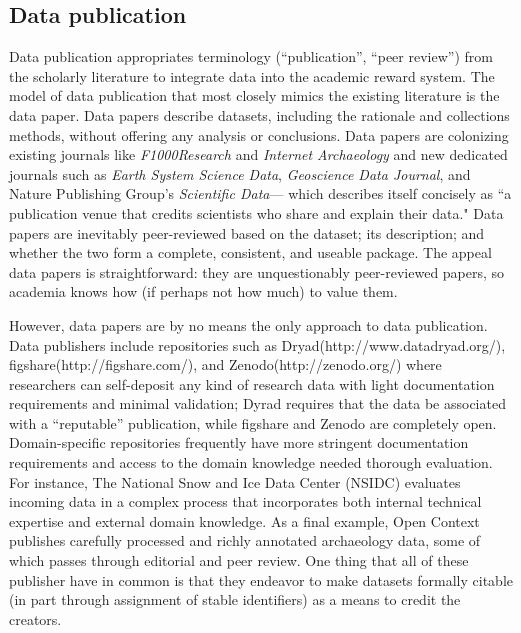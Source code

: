 \documentclass[10pt]{article}
\begin{document}
\subsection*{Data publication}
 
Data publication appropriates terminology (``publication'', ``peer review'') from the scholarly literature to integrate data into the academic reward system\cite{costello_motivating_2009, lawrence_data_2011, atici_other_2012}.
The model of data publication that most closely mimics the existing literature is the data paper.
Data papers describe datasets, including the rationale and collections methods, without offering any analysis or conclusions\cite{newman_data_2009, callaghan_processes_2013}.
Data papers are colonizing existing journals like \emph{F1000Research} and \emph{Internet Archaeology} and new dedicated journals such as \emph{Earth System Science Data}, \emph{Geoscience Data Journal}\cite{allan_geoscience_2014}, and Nature Publishing Group's \emph{Scientific Data}--- which describes itself concisely as ``a publication venue that credits scientists who share and explain their data." \cite{_more_2014}
Data papers are inevitably peer-reviewed based on the dataset; its description; and whether the two form a complete, consistent, and useable package\cite{lawrence_data_2011}.
The appeal data papers is straightforward: they are unquestionably peer-reviewed papers, so academia knows how (if perhaps not how much) to value them.

However, data papers are by no means the only approach to data publication.
Data publishers include repositories such as Dryad(http://www.datadryad.org/), figshare(http://figshare.com/), and Zenodo(http://zenodo.org/) where researchers can self-deposit any kind of research data with light documentation requirements and minimal validation; Dyrad requires that the data be associated with a ``reputable'' publication, while figshare and Zenodo are completely open.
Domain-specific repositories frequently have more stringent documentation requirements and access to the domain knowledge needed thorough evaluation.
For instance, The National Snow and Ice Data Center (NSIDC) evaluates incoming data in a complex process that incorporates both internal technical expertise and external domain knowledge\cite{weaver_data_2012}.
As a final example, Open Context publishes carefully processed and richly annotated archaeology data, some of which passes through editorial and peer review\cite{kansa_we_2014}.
One thing that all of these publisher have in common is that they endeavor to make datasets formally citable (in part through assignment of stable identifiers) as a means to credit the creators.
\end{document}

